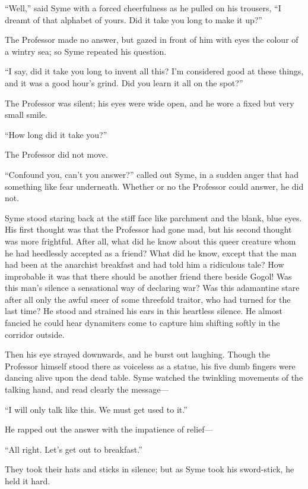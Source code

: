 “Well,” said Syme with a forced cheerfulness as he pulled on his trousers, “I dreamt of that alphabet of yours. Did it take you long to make it up?”

The Professor made no answer, but gazed in front of him with eyes the colour of a wintry sea; so Syme repeated his question.

“I say, did it take you long to invent all this? I’m considered good at these things, and it was a good hour’s grind. Did you learn it all on the spot?”

The Professor was silent; his eyes were wide open, and he wore a fixed but very small smile.

“How long did it take you?”

The Professor did not move.

“Confound you, can’t you answer?” called out Syme, in a sudden anger that had something like fear underneath. Whether or no the Professor could answer, he did not.

Syme stood staring back at the stiff face like parchment and the blank, blue eyes. His first thought was that the Professor had gone mad, but his second thought was more frightful. After all, what did he know about this queer creature whom he had heedlessly accepted as a friend? What did he know, except that the man had been at the anarchist breakfast and had told him a ridiculous tale? How improbable it was that there should be another friend there beside Gogol! Was this man’s silence a sensational way of declaring war? Was this adamantine stare after all only the awful sneer of some threefold traitor, who had turned for the last time? He stood and strained his ears in this heartless silence. He almost fancied he could hear dynamiters come to capture him shifting softly in the corridor outside.

Then his eye strayed downwards, and he burst out laughing. Though the Professor himself stood there as voiceless as a statue, his five dumb fingers were dancing alive upon the dead table. Syme watched the twinkling movements of the talking hand, and read clearly the message⁠—

“I will only talk like this. We must get used to it.”

He rapped out the answer with the impatience of relief⁠—

“All right. Let’s get out to breakfast.”

They took their hats and sticks in silence; but as Syme took his sword-stick, he held it hard.

